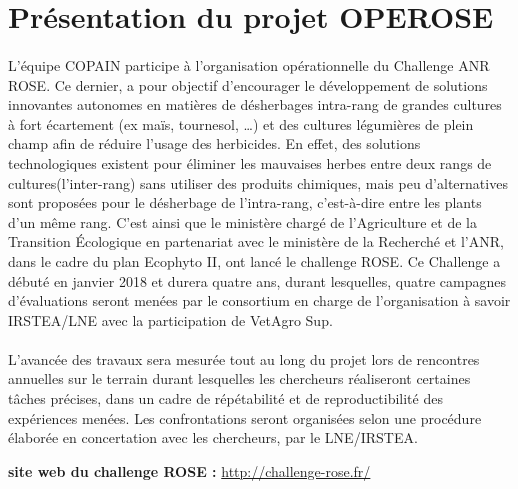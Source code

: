 \section{Présentation du projet \gls{OPEROSE}}
\paragraph{}
L’équipe COPAIN participe à l’organisation opérationnelle du Challenge \gls{ANR} \gls{ROSE}. Ce dernier, a pour objectif d’encourager le développement de solutions innovantes autonomes en matières de désherbages intra-rang de grandes cultures à fort écartement (ex maïs, tournesol, …) et des cultures légumières de plein champ afin de réduire l’usage des herbicides. En effet, des solutions technologiques existent pour éliminer les mauvaises herbes entre deux rangs de cultures(l’inter-rang) sans utiliser des produits chimiques, mais peu d’alternatives sont proposées pour le désherbage de l’intra-rang, c’est-à-dire entre les plants d’un même rang. C’est ainsi que le ministère chargé de l’Agriculture et de la Transition Écologique en partenariat avec le ministère de la Recherché et l’ANR, dans le cadre du plan Ecophyto II, ont lancé le challenge ROSE.  Ce Challenge a débuté en janvier 2018 et durera quatre ans, durant lesquelles, quatre campagnes d’évaluations seront menées par le consortium en charge de l’organisation à savoir IRSTEA/LNE avec la participation de VetAgro Sup.  
\paragraph{}
L’avancée des travaux sera mesurée tout au long du projet lors de rencontres annuelles sur le terrain durant lesquelles les chercheurs réaliseront certaines tâches précises, dans un cadre de répétabilité et de reproductibilité des expériences menées. Les confrontations seront organisées selon une procédure élaborée en concertation avec les chercheurs, par le LNE/IRSTEA. 

%

\textbf{site web du challenge ROSE : }\url{http://challenge-rose.fr/}


